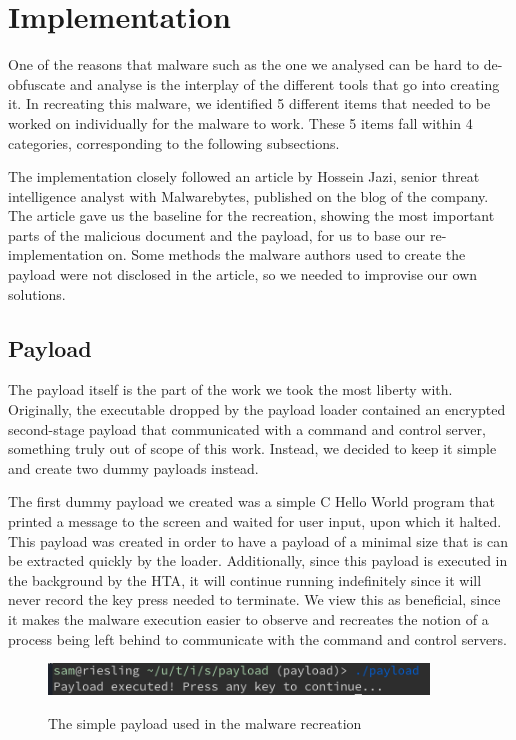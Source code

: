\chapter{Implementation}
One of the reasons that malware such as the one we analysed can be hard to de-obfuscate and analyse is the interplay of
the different tools that go into creating it. In recreating this malware, we identified 5 different items that needed
to be worked on individually for the malware to work. These 5 items fall within 4 categories, corresponding to the
following subsections. 

The implementation closely followed an article by Hossein Jazi, senior threat intelligence analyst with Malwarebytes,
published on the blog of the company. The article gave us the baseline for the recreation, showing the most important
parts of the malicious document and the payload, for us to base our re-implementation on. Some methods the malware
authors used to create the payload were not disclosed in the article, so we needed to improvise our own solutions.

\section{Payload} \label{sec:impl-payload}
The payload itself is the part of the work we took the most liberty with. Originally, the executable dropped by the
payload loader contained an encrypted second-stage payload that communicated with a command and control server,
something truly out of scope of this work. Instead, we decided to keep it simple and create two dummy payloads instead.

The first dummy payload we created was a simple C Hello World program that printed a message to the screen and waited 
for user input, upon which it halted. This payload was created in order to have a payload of a minimal size that is 
can be extracted quickly by the loader. Additionally, since this payload is executed in the background by the
\acrshort{HTA}, it will continue running indefinitely since it will never record the key press needed to terminate.
We view this as beneficial, since it makes the malware execution easier to observe and recreates the notion of a process 
being left behind to communicate with the command and control servers.

\begin{figure}[H]
  \centering
  \includegraphics[width=0.9\textwidth]{figures/payload_exe_demo.png}
  \label{c-payload-demonstration}
  \caption{The simple payload used in the malware recreation}
\end{figure}

